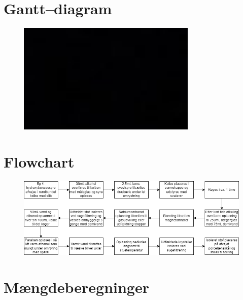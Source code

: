 \appendix


    \section{Gantt--diagram}
    \begin{figure}[H]
        \includegraphics[width=\textwidth]{bilag/gantt}
        \caption{}
    \end{figure}

    \section{Flowchart}
    \begin{figure}[H] \centering
        \includegraphics[width=\textwidth]{bilag/flowdiagram}
        \caption{}
    \end{figure} 
    
    \section{Mængdeberegninger}
